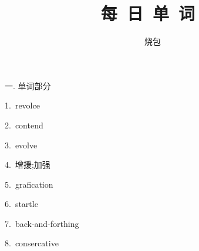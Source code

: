 \documentclass[a4paper, 12pt]{article}
\begin{document}
    \noindent

    \title{每\ 日\ 单\ 词\ }
    \author{烧包}
    \maketitle

\begin{flushleft}
一. 单词部分
\end{flushleft}

\begin{multicols}{2}
\begin{flushleft}
1.\ revolce \ \ \ \ \underline{\hspace{3cm}}
\end{flushleft}

\begin{flushleft}
2.\ contend \ \ \ \ \underline{\hspace{3cm}}
\end{flushleft}
\end{multicols}

\begin{multicols}{2}
\begin{flushleft}
3.\ evolve \ \ \ \ \underline{\hspace{3cm}}
\end{flushleft}

\begin{flushleft}
4.\ 增援;加强 \ \ \ \ \underline{\hspace{3cm}}
\end{flushleft}
\end{multicols}

\begin{multicols}{2}
\begin{flushleft}
5.\ grafication \ \ \ \ \underline{\hspace{3cm}}
\end{flushleft}

\begin{flushleft}
6.\ startle \ \ \ \ \underline{\hspace{3cm}}
\end{flushleft}
\end{multicols}

\begin{multicols}{2}
\begin{flushleft}
7.\ back-and-forthing \ \ \ \ \underline{\hspace{3cm}}
\end{flushleft}

\begin{flushleft}
8.\ consercative \ \ \ \ \underline{\hspace{3cm}}
\end{flushleft}
\end{multicols}
\end{document}
